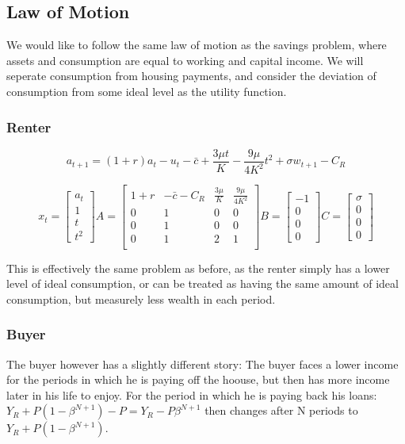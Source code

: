 \documentclass[10pt]{paper}
\begin{document}
\subsection*{Law of Motion}

We would like to follow the same law of motion as the savings problem,
where assets and consumption are equal to working and capital
income. We will seperate consumption from housing payments, and
consider the deviation of consumption from some ideal level as the
utility function.

\subsubsection*{Renter}
$$a_{t+1} = (1+r)a_t - u_t - \bar{c} + \frac{3\mu t}{K} - \frac{9\mu}{4K^2}t^2 + \sigma
w_{t+1} - C_R$$

$$x_t =
\begin{bmatrix}
  a_t\\1\\t\\t^2
\end{bmatrix}
A =
\begin{bmatrix}
  1+r & -\bar{c} - C_R & \frac{3 \mu}{K} & \frac{9\mu}{4K^2}\\
  0 & 1 & 0 & 0\\
  0 & 1 & 0 & 0\\
  0 & 1 & 2 & 1\\
\end{bmatrix}
 B =
 \begin{bmatrix}
   -1\\0\\0\\0
 \end{bmatrix}
C =
\begin{bmatrix}
  \sigma\\0\\0\\0
\end{bmatrix}
$$

This is effectively the same problem as before, as the renter simply has a lower
level of ideal consumption, or can be treated as having the same
amount of ideal consumption, but measurely less wealth in each
period.

\subsubsection*{Buyer}

The buyer however has a slightly different story: The buyer faces a
lower income for the periods in which he is paying off the hoouse, but
then has more income later in his life to enjoy. For the period in
which he is paying back his loans: $Y_R + P( 1- \beta^{N+1} ) - P = Y_R -
P \beta^{N+1}$
then changes after N periods to $Y_R + P( 1- \beta^{N+1} )$.
\end{document}
